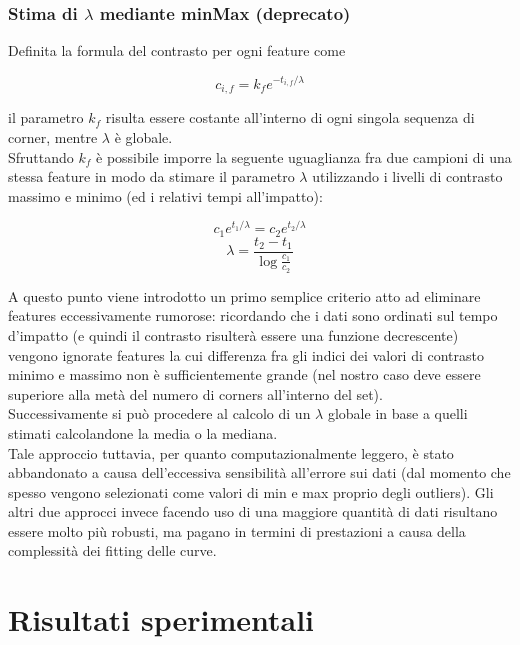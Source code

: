 \documentclass[12pt]{report}
\begin{document}
\subsection{Stima di $\lambda$ mediante minMax (deprecato)}
\label{sect:minmax}

\noindent Definita la formula del contrasto per ogni feature come

$$ c_{i,f} = k_fe^{-t_{i,f}/\lambda} $$

\noindent il parametro $k_f$ risulta essere costante all'interno di ogni singola sequenza di corner, mentre $\lambda$ \`e globale.\\
\noindent Sfruttando $k_f$ \`e possibile imporre la seguente uguaglianza fra due campioni di una stessa feature in modo da stimare il parametro $\lambda$ utilizzando i livelli di contrasto massimo e minimo (ed i relativi tempi all'impatto):

$$ c_1e^{t_1/\lambda} = c_2e^{t_2/\lambda} $$
$$ \lambda = \frac{t_2-t_1}{\log\frac{c_1}{c_2}} $$

\noindent A questo punto viene introdotto un primo semplice criterio atto ad eliminare features eccessivamente rumorose: ricordando che i dati sono ordinati sul tempo d'impatto (e quindi il contrasto risulter\`a essere una funzione decrescente) vengono ignorate features la cui differenza fra gli indici dei valori di contrasto minimo e massimo non \`e sufficientemente grande (nel nostro caso deve essere superiore alla met\`a del numero di corners all'interno del set).\\

\noindent Successivamente si pu\`o procedere al calcolo di un $\lambda$ globale in base a quelli stimati calcolandone la media o la mediana.\\

\noindent Tale approccio tuttavia, per quanto computazionalmente leggero, \`e stato abbandonato a causa dell'eccessiva sensibilit\`a all'errore sui dati (dal momento che spesso vengono selezionati come valori di min e max proprio degli outliers). Gli altri due approcci invece facendo uso di una maggiore quantit\`a di dati risultano essere molto pi\`u robusti, ma pagano in termini di prestazioni a causa della complessit\`a dei fitting delle curve.






\chapter{Risultati sperimentali}
\end{document}
